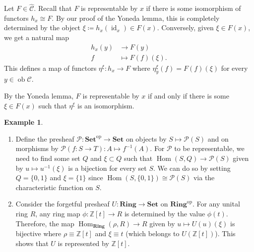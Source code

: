 \documentclass[10pt,letterpaper,cm]{nupset}
\theoremstyle{definition}
\newtheorem{exmp}[definition]{Example}
\theoremstyle{theorem}
\theoremstyle{remark}
\renewcommand{\P}{\mathcal P}
\newcommand{\Z}{\mathbb Z}
\newcommand{\1}{\mathbf{1}}
\renewcommand{\c}{\mathscr{C}}
\newcommand{\0}{\vec 0}
\DeclareMathOperator{\id}{\mathrm{id}}
\DeclareMathOperator{\op}{op}
\DeclareMathOperator{\ob}{ob}
\DeclareMathOperator{\Hom}{Hom}
\begin{document}
Let $F \in \widehat{\c}$. Recall that $F$ is representable by $x$ if there is some isomorphism of functors $h_x \cong F$. By our proof of the Yoneda lemma, this is completely determined by the object $\xi\coloneqq  h_x(\id_x) \in F(x)$. Conversely, given $\xi \in F(x)$, we get a natural map \begin{align*}
h_x(y) &  \to F(y)
\\  f &  \mapsto F(f)(\xi).
\end{align*} This defines a map of functors $\eta^{\xi} : h_x \to F$ where $\eta^{\xi}_y(f) = F(f)(\xi)$ for every $y \in \ob \c$. 

\medskip

 By the Yoneda lemma, $F$ is representable by $x$  if and only if there is some $\xi \in F(x)$ such that $\eta^{\xi}$ is an isomorphism. 

\begin{exmp} $ $
\begin{enumerate}
\item Define the presheaf $\P : \mathbf{Set}^{\op} \to \mathbf{Set}$ on objects by $S \mapsto \P(S)$ and on morphisms by $\P(f : S \to T) : A \mapsto f^{-1}(A).$ For $\P$ to be representable, we need to find some set $Q$ and $\xi \subset Q$ such that $\Hom(S, Q) \to \P(S)$ given by $u \mapsto u^{-1}(\xi)$ is a bijection for every set $S$. We can do so by setting $Q = \{0, 1\}$ and $\xi = \{1\}$ since $\Hom(S, \{0, 1\}) \cong \P(S)$ via the characteristic function on $S$.
\item Consider the forgetful presheaf $U: \mathbf{Ring} \to \mathbf{Set}$ on  $\mathbf{Ring}^{\op}$.  For any unital ring $R$, any ring map $\phi : \Z[t] \to R$ is determined by the value $\phi(t)$. Therefore, the map $\Hom_{\mathbf{Ring}}( \rho, R) \to R$ given by $u \mapsto U(u)(\xi)$ is bijective where $\rho \equiv \Z[t]$ and $\xi \equiv t$ (which belongs to $U(\Z[t])$). This shows that $U$ is represented by $\Z[t]$.
\end{enumerate}
\end{exmp}
\end{document}
